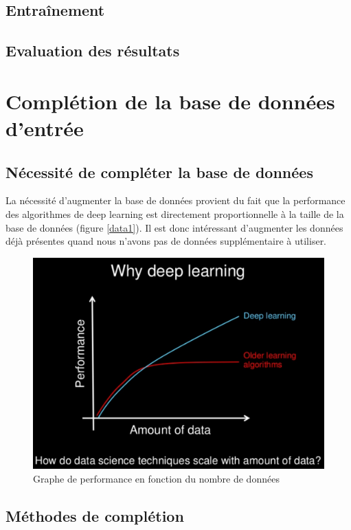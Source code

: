 \documentclass[a4paper,11pt]{article}
\begin{document}
\subsection{Entraînement}
\subsection{Evaluation des résultats}

\section{Complétion de la base de données d'entrée}
\label{sec:completion}
    
    \subsection{Nécessité de compléter la base de données}

	La nécessité d'augmenter la base de données provient du fait que la performance des
	algorithmes de deep learning est directement proportionnelle à la taille de la base de
	données (figure \ref{data1}). Il est donc intéressant d'augmenter les données déjà présentes
	quand nous n'avons pas de données supplémentaire à utiliser.

	\begin{figure}[H]
	    \centering
	    \includegraphics[scale=0.3]{deeplearning_data.png}
	    \caption{Graphe de performance en fonction du nombre de données}
	    \label{fig:data1}
	\end{figure}

    \subsection{Méthodes de complétion}
\end{document}
